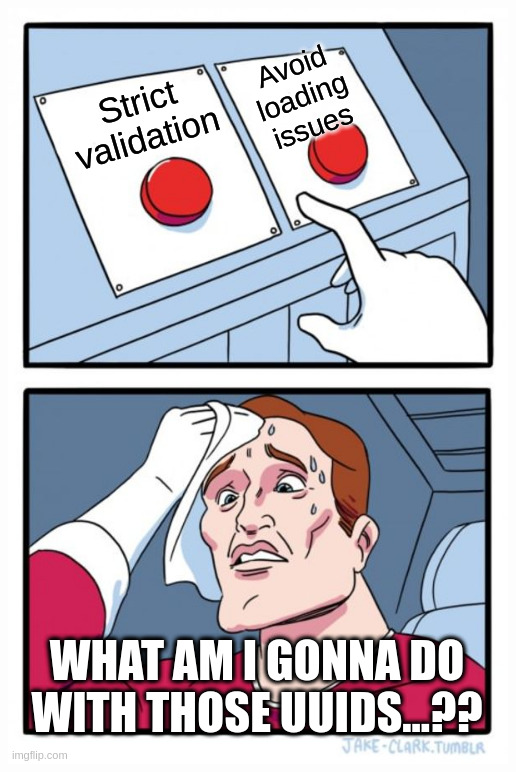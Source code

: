 \begin{frame}
\begin{minipage}{0.4\textwidth}
        \includegraphics[scale=0.25]{images/two_buttons_dilemna.jpg}
    \end{minipage}
\end{frame}

